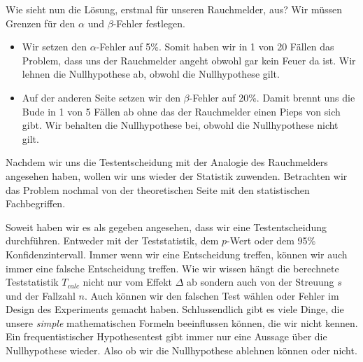 \documentclass[
  letterpaper,
  DIV=11,
  oneside]{scrreport}
\providecommand{\tightlist}{%
  \setlength{\itemsep}{0pt}\setlength{\parskip}{0pt}}\usepackage{longtable,booktabs,array}
\begin{document}
Wie sieht nun die Lösung, erstmal für unseren Rauchmelder, aus? Wir
müssen Grenzen für den \(\alpha\) und \(\beta\)-Fehler festlegen.

{}

\begin{itemize}
\tightlist
\item
  Wir setzen den \(\alpha\)-Fehler auf 5\%. Somit haben wir in 1 von 20
  Fällen das Problem, dass uns der Rauchmelder angeht obwohl gar kein
  Feuer da ist. Wir lehnen die Nullhypothese ab, obwohl die
  Nullhypothese gilt.
\end{itemize}

{}

\begin{itemize}
\tightlist
\item
  Auf der anderen Seite setzen wir den \(\beta\)-Fehler auf 20\%. Damit
  brennt uns die Bude in 1 von 5 Fällen ab ohne das der Rauchmelder
  einen Pieps von sich gibt. Wir behalten die Nullhypothese bei, obwohl
  die Nullhypothese nicht gilt.
\end{itemize}

Nachdem wir uns die Testentscheidung mit der Analogie des Rauchmelders
angesehen haben, wollen wir uns wieder der Statistik zuwenden.
Betrachten wir das Problem nochmal von der theoretischen Seite mit den
statistischen Fachbegriffen.

Soweit haben wir es als gegeben angesehen, dass wir eine
Testentscheidung durchführen. Entweder mit der Teststatistik, dem
\(p\)-Wert oder dem 95\% Konfidenzintervall. Immer wenn wir eine
Entscheidung treffen, können wir auch immer eine falsche Entscheidung
treffen. Wie wir wissen hängt die berechnete Teststatistik \(T_{calc}\)
nicht nur vom Effekt \(\Delta\) ab sondern auch von der Streuung \(s\)
und der Fallzahl \(n\). Auch können wir den falschen Test wählen oder
Fehler im Design des Experiments gemacht haben. Schlussendlich gibt es
viele Dinge, die unsere \emph{simple} mathematischen Formeln
beeinflussen können, die wir nicht kennen. Ein frequentistischer
Hypothesentest gibt immer nur eine Aussage über die Nullhypothese
wieder. Also ob wir die Nullhypothese ablehnen können oder nicht.
\end{document}
